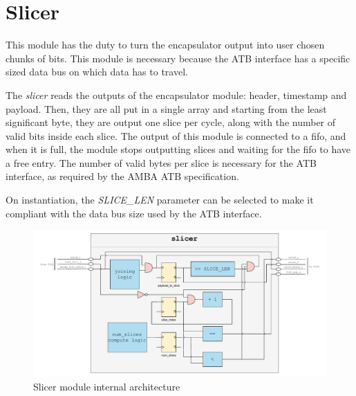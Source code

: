 \chapter{Slicer}\label{slicer}

This module has the duty to turn the encapsulator output into user chosen chunks of bits.
This module is necessary because the ATB interface has a specific sized data bus on which data 
has to travel.

The \textit{slicer} reads the outputs of the encapsulator module: header, timestamp and payload.
Then, they are all put in a single array and starting from the least significant byte, they are 
output one slice per cycle, along with the number of valid bits inside each slice.
The output of this module is connected to a fifo, and when it is full, the module stops 
outputting slices and waiting for the fifo to have a free entry.
The number of valid bytes per slice is necessary for the ATB interface, as required by the AMBA 
ATB specification.

On instantiation, the \textit{SLICE\_LEN} parameter can be selected to make it compliant with the 
data bus size used by the ATB interface.

\begin{figure}[H]
    \centering
    \includegraphics[width=1\textwidth]{img/slicer.pdf}
    \caption{Slicer module internal architecture}
    \label{fig:slicer_architecture}
\end{figure}